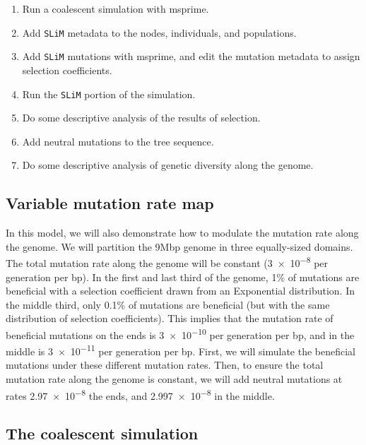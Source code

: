 \documentclass[12pt]{article}
\newcommand{\slim}[0]{\texttt{SLiM}\xspace}
\begin{document}
\begin{enumerate}
    \item Run a coalescent simulation with msprime.

    \item Add \slim metadata to the nodes, individuals, and populations.

    \item Add \slim mutations with msprime, and edit the mutation metadata to assign selection coefficients.

    \item Run the \slim portion of the simulation.

    \item Do some descriptive analysis of the results of selection.

    \item Add neutral mutations to the tree sequence.

    \item Do some descriptive analysis of genetic diversity along the genome.
\end{enumerate}

\subsection*{Variable mutation rate map}

In this model, we will also demonstrate how to modulate the mutation rate along the genome.
We will partition the 9Mbp genome in three equally-sized domains.
The total mutation rate along the genome will be constant (\num{3e-8} per generation per bp).
In the first and last third of the genome, 1\% of mutations are beneficial with a selection coefficient drawn from an Exponential distribution.
In the middle third, only 0.1\% of mutations are beneficial (but with the same distribution of selection coefficients).
This implies that the mutation rate of beneficial mutations on the ends is \num{3e-10} per generation per bp, and in the middle is \num{3e-11} per generation per bp.
First, we will simulate the beneficial mutations under these different mutation rates.
Then, to ensure the total mutation rate along the genome is constant, we will add neutral mutations at rates \num{2.97e-8} the ends, and \num{2.997e-8} in the middle.


 \subsection*{The coalescent simulation}
\end{document}
